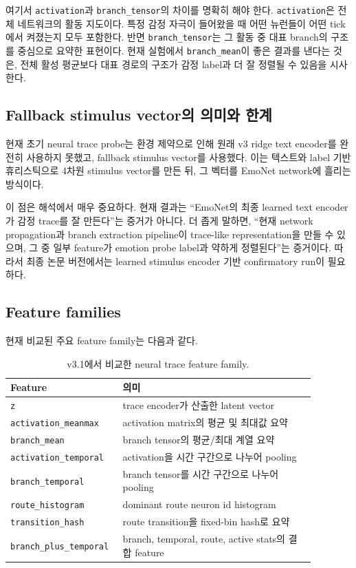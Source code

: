 \documentclass[11pt,a4paper]{article}
\begin{document}
여기서 \texttt{activation}과 \texttt{branch\_tensor}의 차이를 명확히 해야 한다. \texttt{activation}은 전체 네트워크의 활동 지도이다. 특정 감정 자극이 들어왔을 때 어떤 뉴런들이 어떤 tick에서 켜졌는지 모두 포함한다. 반면 \texttt{branch\_tensor}는 그 활동 중 대표 branch의 구조를 중심으로 요약한 표현이다. 현재 실험에서 \texttt{branch\_mean}이 좋은 결과를 낸다는 것은, 전체 활성 평균보다 대표 경로의 구조가 감정 label과 더 잘 정렬될 수 있음을 시사한다.

\subsection{Fallback stimulus vector의 의미와 한계}

현재 초기 neural trace probe는 환경 제약으로 인해 원래 v3 ridge text encoder를 완전히 사용하지 못했고, fallback stimulus vector를 사용했다. 이는 텍스트와 label 기반 휴리스틱으로 4차원 stimulus vector를 만든 뒤, 그 벡터를 EmoNet network에 흘리는 방식이다.

이 점은 해석에서 매우 중요하다. 현재 결과는 ``EmoNet의 최종 learned text encoder가 감정 trace를 잘 만든다''는 증거가 아니다. 더 좁게 말하면, ``현재 network propagation과 branch extraction pipeline이 trace-like representation을 만들 수 있으며, 그 중 일부 feature가 emotion probe label과 약하게 정렬된다''는 증거이다. 따라서 최종 논문 버전에서는 learned stimulus encoder 기반 confirmatory run이 필요하다.

\subsection{Feature families}

현재 비교된 주요 feature family는 다음과 같다.

\begin{table}[h]
\centering
\begin{tabular}{p{0.28\linewidth}p{0.60\linewidth}}
\toprule
Feature & 의미 \\
\midrule
\texttt{z} & trace encoder가 산출한 latent vector \\
\texttt{activation\_meanmax} & activation matrix의 평균 및 최대값 요약 \\
\texttt{branch\_mean} & branch tensor의 평균/최대 계열 요약 \\
\texttt{activation\_temporal} & activation을 시간 구간으로 나누어 pooling \\
\texttt{branch\_temporal} & branch tensor를 시간 구간으로 나누어 pooling \\
\texttt{route\_histogram} & dominant route neuron id histogram \\
\texttt{transition\_hash} & route transition을 fixed-bin hash로 요약 \\
\texttt{branch\_plus\_temporal} & branch, temporal, route, active stats의 결합 feature \\
\bottomrule
\end{tabular}
\caption{v3.1에서 비교한 neural trace feature family.}
\end{table}
\end{document}
